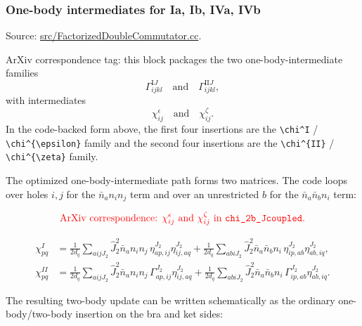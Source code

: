 \documentclass[
]{article}
\begin{document}
\subsubsection{One-body intermediates for Ia, Ib, IVa,
IVb}\label{one-body-intermediates-for-ia-ib-iva-ivb}

Source:
\href{../src/FactorizedDoubleCommutator.cc\#L850-L1144}{src/FactorizedDoubleCommutator.cc}.

ArXiv correspondence tag: this block packages the two
one-body-intermediate families \begin{equation}
\Gamma^{\mathrm{I}J}_{ijkl}
\quad\text{and}\quad
\Gamma^{\mathrm{II}J}_{ijkl},
\end{equation} with intermediates \begin{equation}
\chi^{\epsilon}_{ij}
\quad\text{and}\quad
\chi^{\zeta}_{ij}.
\end{equation} In the code-backed form above, the first four insertions are the
\texttt{\textbackslash{}chi\^{}I} /
\texttt{\textbackslash{}chi\^{}\{\textbackslash{}epsilon\}} family and
the second four insertions are the
\texttt{\textbackslash{}chi\^{}\{II\}} /
\texttt{\textbackslash{}chi\^{}\{\textbackslash{}zeta\}} family.

The optimized one-body-intermediate path forms two matrices. The code
loops over holes \(i,j\) for the \(\bar n_a n_i n_j\) term and over an
unrestricted \(b\) for the \(\bar n_a\bar n_b n_i\) term:

\begin{equation}
{\color{red}\text{ArXiv correspondence: }\chi^{\epsilon}_{ij}\text{ and }\chi^{\zeta}_{ij}\text{ in }\texttt{chi\_2b\_Jcoupled}.}
\end{equation}

\begin{equation}
\begin{aligned}
\chi^{I}_{pq}
&=\frac{1}{2d_q}\sum_{aijJ_2}\hat J_2^2\bar n_a n_i n_j\,
\eta^{J_2}_{ap,ij}\eta^{J_2}_{ij,aq}
+\frac{1}{2d_q}\sum_{abiJ_2}\hat J_2^2\bar n_a\bar n_b n_i\,
\eta^{J_2}_{ip,ab}\eta^{J_2}_{ab,iq},\\
\chi^{II}_{pq}
&=\frac{1}{2d_q}\sum_{aijJ_2}\hat J_2^2\bar n_a n_i n_j\,
\Gamma^{J_2}_{ap,ij}\eta^{J_2}_{ij,aq}
+\frac{1}{2d_q}\sum_{abiJ_2}\hat J_2^2\bar n_a\bar n_b n_i\,
\Gamma^{J_2}_{ip,ab}\eta^{J_2}_{ab,iq}.
\end{aligned}
\end{equation}

The resulting two-body update can be written schematically as the
ordinary one-body/two-body insertion on the bra and ket sides:
\end{document}

